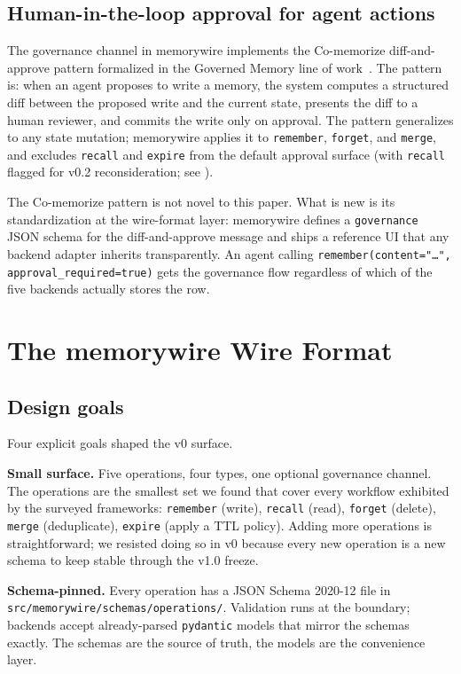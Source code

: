 \documentclass[11pt,letterpaper,twocolumn]{article}
\begin{document}
\subsection{Human-in-the-loop approval for agent actions}

The governance channel in memorywire implements the Co-memorize diff-and-approve pattern formalized in the Governed Memory line of work~\cite{taheri2026governed}. The pattern is: when an agent proposes to write a memory, the system computes a structured diff between the proposed write and the current state, presents the diff to a human reviewer, and commits the write only on approval. The pattern generalizes to any state mutation; memorywire applies it to \texttt{remember}, \texttt{forget}, and \texttt{merge}, and excludes \texttt{recall} and \texttt{expire} from the default approval surface (with \texttt{recall} flagged for v0.2 reconsideration; see ).

The Co-memorize pattern is not novel to this paper. What is new is its standardization at the wire-format layer: memorywire defines a \texttt{governance} JSON schema for the diff-and-approve message and ships a reference UI that any backend adapter inherits transparently. An agent calling \texttt{remember(content="\ldots", approval\_required=true)} gets the governance flow regardless of which of the five backends actually stores the row.

\section{The memorywire Wire Format}
\label{sec:spec}

\subsection{Design goals}
\label{sec:spec-goals}

Four explicit goals shaped the v0 surface.

\textbf{Small surface.} Five operations, four types, one optional governance channel. The operations are the smallest set we found that cover every workflow exhibited by the surveyed frameworks: \texttt{remember} (write), \texttt{recall} (read), \texttt{forget} (delete), \texttt{merge} (deduplicate), \texttt{expire} (apply a TTL policy). Adding more operations is straightforward; we resisted doing so in v0 because every new operation is a new schema to keep stable through the v1.0 freeze.

\textbf{Schema-pinned.} Every operation has a JSON Schema 2020-12 file in \texttt{src/memorywire/schemas/operations/}. Validation runs at the boundary; backends accept already-parsed \texttt{pydantic} models that mirror the schemas exactly. The schemas are the source of truth, the models are the convenience layer.
\end{document}

